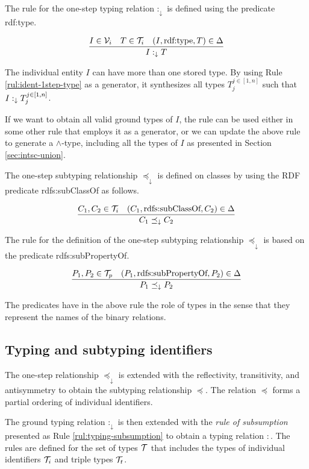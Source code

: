 \documentclass[runningheads]{llncs}
\newcommand{\darr}{\downarrow}
\newcommand{\V}{{\cal V}}
\newcommand{\T}{{\cal T}}
\begin{document}
The rule for the one-step typing relation $:_\darr$ is defined using the
predicate rdf:type.

\begin{equation}
\label{rul:ident-1step-type}
\dfrac{I\in\V_i\quad T\in\T_i\quad (I,\text{rdf:type},T)\in\D}
      {I :_\darr T}
\end{equation}

The individual entity $I$ can have more than one stored type. By
using Rule \ref{rul:ident-1step-type} as a generator, it synthesizes
all types $T_j^{j\in[1,n]}$ such that $I:_\darr\/T_j^{j\in[1,n]}$.

If we want to obtain all valid ground types of $I$, the rule can be
used either in some other rule that employs it as a generator, or we
can update the above rule to generate a $\land$-type, including all
the types of $I$ as presented in Section \ref{sec:intsc-union}.

The one-step subtyping relationship $\preceq_\darr$ is defined on
classes by using the RDF predicate rdfs:sub\-ClassOf as follows.

\begin{equation}
\label{rul:ident-1step-subtype}
\dfrac{C_1,C_2\in\T_i \quad (C_1,\text{rdfs:subClassOf},C_2)\in\D}
{C_1 \preceq_\darr\/C_2}
\end{equation}

The rule for the definition of the one-step subtyping relationship
$\preceq_\darr$ is based on the predicate rdfs:subPropertyOf.

\begin{equation}
\dfrac{P_1,P_2\in\T_p \quad (P_1,\text{rdfs:subPropertyOf},P_2)\in\D}
      {P_1\preceq_\darr\/P_2}
\end{equation}

The predicates have in the above rule the role of types in the sense
that they represent the names of the binary relations. 



\subsection{Typing and subtyping identifiers\label{sec:idents-typing}}

The one-step relationship $\preceq_\darr$ is extended with the
reflectivity, transitivity, and antisymmetry to obtain the subtyping
relationship $\preceq$. The relation $\preceq$ forms a partial
ordering of individual identifiers.

The ground typing relation $:_\darr$ is then extended with the
\emph{rule of subsumption} presented as Rule
\ref{rul:typing-subsumption} to obtain a typing relation $:$. The
rules are defined for the set of types $\T$ that includes the types of
individual identifiers $\T_i$ and triple types $\T_t$.
\end{document}
